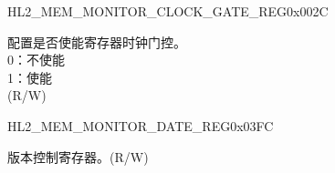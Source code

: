 \begin{register}{H}{L2\_MEM\_MONITOR\_CLOCK\_GATE\_REG}{0x002C}\label{regdesc:L2MEMMONITORCLOCKGATEREG}
%
%
\regnewline%
\begin{regdesc}\begin{reglist}
\label{fielddesc:L2MEMMONITORCLKEN}\item [L2\_MEM\_MONITOR\_CLK\_EN] 配置是否使能寄存器时钟门控。\\
0：不使能\\
1：使能\\
(R/W)
\end{reglist}\end{regdesc}
\end{register}

\begin{register}{H}{L2\_MEM\_MONITOR\_DATE\_REG}{0x03FC}\label{regdesc:L2MEMMONITORDATEREG}
%
%
\regnewline%
\begin{regdesc}\begin{reglist}
\label{fielddesc:L2MEMMONITORDATE}\item [L2\_MEM\_MONITOR\_DATE] 版本控制寄存器。(R/W)
\end{reglist}\end{regdesc}
\end{register}
